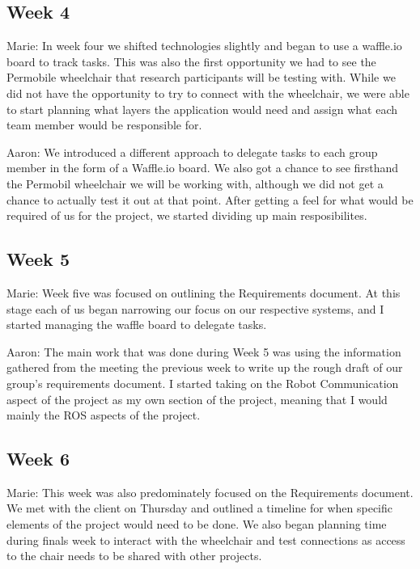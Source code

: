 \documentclass[onecolumn, draftclsnofoot,10pt, compsoc]{IEEEtran}
\begin{document}
\subsection{Week 4}
Marie: In week four we shifted technologies slightly and began to use a waffle.io board to track tasks. This was also the first opportunity we had to see the Permobile wheelchair that research participants will be testing with. While we did not have the opportunity to try to connect with the wheelchair, we were able to start planning what layers the application would need and assign what each team member would be responsible for.\par

Aaron: We introduced a different approach to delegate tasks to each group member in the form of a Waffle.io board. We also got a chance to see firsthand the Permobil wheelchair we will be working with, although we did not get a chance to actually test it out at that point. After getting a feel for what would be required of us for the project, we started dividing up main resposibilites.\par

\subsection{Week 5}
Marie: Week five was focused on outlining the Requirements document. At this stage each of us began narrowing our focus on our respective systems, and I started managing the waffle board to delegate tasks.\par

Aaron: The main work that was done during Week 5 was using the information gathered from the meeting the previous week to write up the rough draft of our group's requirements document. I started taking on the Robot Communication aspect of the project as my own section of the project, meaning that I would mainly the ROS aspects of the project.\par

\subsection{Week 6}
Marie: This week was also predominately focused on the Requirements document. We met with the client on Thursday and outlined a timeline for when specific elements of the project would need to be done. We also began planning time during finals week to interact with the wheelchair and test connections as access to the chair needs to be shared with other projects.\par
\end{document}
